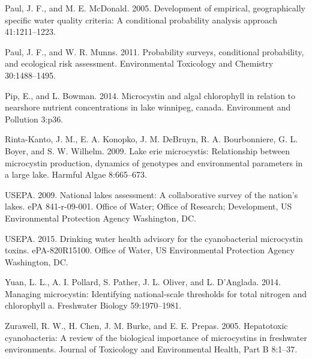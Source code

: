 \documentclass[11pt,]{article}
\begin{document}
Paul, J. F., and M. E. McDonald. 2005. Development of empirical,
geographically specific water quality criteria: A conditional
probability analysis approach 41:1211--1223.

Paul, J. F., and W. R. Munns. 2011. Probability surveys, conditional
probability, and ecological risk assessment. Environmental Toxicology
and Chemistry 30:1488--1495.

Pip, E., and L. Bowman. 2014. Microcystin and algal chlorophyll in
relation to nearshore nutrient concentrations in lake winnipeg, canada.
Environment and Pollution 3:p36.

Rinta-Kanto, J. M., E. A. Konopko, J. M. DeBruyn, R. A. Bourbonniere, G.
L. Boyer, and S. W. Wilhelm. 2009. Lake erie microcystis: Relationship
between microcystin production, dynamics of genotypes and environmental
parameters in a large lake. Harmful Algae 8:665--673.

USEPA. 2009. National lakes assessment: A collaborative survey of the
nation's lakes. ePA 841-r-09-001. Office of Water; Office of Research;
Development, US Environmental Protection Agency Washington, DC.

USEPA. 2015. Drinking water health advisory for the cyanobacterial
microcystin toxins. ePA-820R15100. Office of Water, US Environmental
Protection Agency Washington, DC.

Yuan, L. L., A. I. Pollard, S. Pather, J. L. Oliver, and L. D'Anglada.
2014. Managing microcystin: Identifying national-scale thresholds for
total nitrogen and chlorophyll a. Freshwater Biology 59:1970--1981.

Zurawell, R. W., H. Chen, J. M. Burke, and E. E. Prepas. 2005.
Hepatotoxic cyanobacteria: A review of the biological importance of
microcystins in freshwater environments. Journal of Toxicology and
Environmental Health, Part B 8:1--37.
\end{document}
